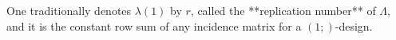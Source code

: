 One traditionally denotes $\lambda(1)$ by $r$, called the **replication number** of $\Lambda$, and it is the constant row sum of any incidence matrix for a $(1;)$-design.
